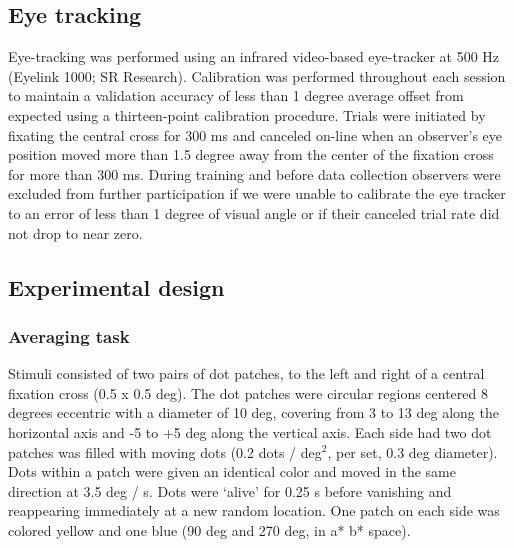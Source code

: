 \subsection{Eye tracking}

Eye-tracking was performed using an infrared video-based eye-tracker at 500 Hz (Eyelink 1000; SR Research). Calibration was performed throughout each session to maintain a validation accuracy of less than 1 degree average offset from expected using a thirteen-point calibration procedure. Trials were initiated by fixating the central cross for 300 ms and canceled on-line when an observer’s eye position moved more than 1.5 degree away from the center of the fixation cross for more than 300 ms. During training and before data collection observers were excluded from further participation if we were unable to calibrate the eye tracker to an error of less than 1 degree of visual angle or if their canceled trial rate did not drop to near zero.

\subsection{Experimental design}

\subsubsection{Averaging task}

Stimuli consisted of two pairs of dot patches, to the left and right of a central fixation cross (0.5 x 0.5 deg). The dot patches were circular regions centered 8 degrees eccentric with a diameter of 10 deg, covering from 3 to 13 deg along the horizontal axis and -5 to +5 deg along the vertical axis. Each side had two dot patches was filled with moving dots (0.2 dots / deg$^2$, per set, 0.3 deg diameter). Dots within a patch were given an identical color and moved in the same direction at 3.5 deg / s. Dots were `alive' for 0.25 s before vanishing and reappearing immediately at a new random location. One patch on each side was colored yellow and one blue (90 deg and 270 deg, in a* b* space). 

